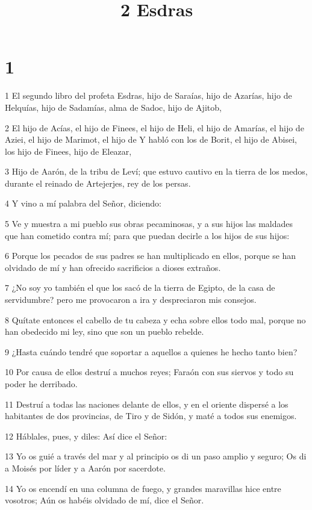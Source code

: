 

\title{2 Esdras}

\chapter{1}

\par 1 El segundo libro del profeta Esdras, hijo de Saraías, hijo de Azarías, hijo de Helquías, hijo de Sadamías, alma de Sadoc, hijo de Ajitob,
\par 2 El hijo de Acías, el hijo de Finees, el hijo de Heli, el hijo de Amarías, el hijo de Aziei, el hijo de Marimot, el hijo de Y habló con los de Borit, el hijo de Abisei, los hijo de Finees, hijo de Eleazar,
\par 3 Hijo de Aarón, de la tribu de Leví; que estuvo cautivo en la tierra de los medos, durante el reinado de Artejerjes, rey de los persas.
\par 4 Y vino a mí palabra del Señor, diciendo:
\par 5 Ve y muestra a mi pueblo sus obras pecaminosas, y a sus hijos las maldades que han cometido contra mí; para que puedan decirle a los hijos de sus hijos:
\par 6 Porque los pecados de sus padres se han multiplicado en ellos, porque se han olvidado de mí y han ofrecido sacrificios a dioses extraños.
\par 7 ¿No soy yo también el que los sacó de la tierra de Egipto, de la casa de servidumbre? pero me provocaron a ira y despreciaron mis consejos.
\par 8 Quítate entonces el cabello de tu cabeza y echa sobre ellos todo mal, porque no han obedecido mi ley, sino que son un pueblo rebelde.
\par 9 ¿Hasta cuándo tendré que soportar a aquellos a quienes he hecho tanto bien?
\par 10 Por causa de ellos destruí a muchos reyes; Faraón con sus siervos y todo su poder he derribado.
\par 11 Destruí a todas las naciones delante de ellos, y en el oriente dispersé a los habitantes de dos provincias, de Tiro y de Sidón, y maté a todos sus enemigos.
\par 12 Háblales, pues, y diles: Así dice el Señor:
\par 13 Yo os guié a través del mar y al principio os di un paso amplio y seguro; Os di a Moisés por líder y a Aarón por sacerdote.
\par 14 Yo os encendí en una columna de fuego, y grandes maravillas hice entre vosotros; Aún os habéis olvidado de mí, dice el Señor.
